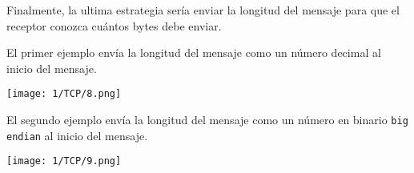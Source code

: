 Finalmente, la ultima estrategia sería enviar la longitud del mensaje
para que el receptor conozca cuántos bytes debe enviar.

El primer ejemplo envía la longitud del mensaje como un número decimal
al inicio del mensaje.

\begin{minipage}{\linewidth}
	\centering
	\texttt{[image: 1/TCP/8.png]}
	\label{fig:1/10}
\end{minipage}

El segundo ejemplo envía la longitud del mensaje como un número en binario
\verb#big endian# al inicio del mensaje.

\begin{minipage}{\linewidth}
	\centering
	\texttt{[image: 1/TCP/9.png]}
	\label{fig:1/11}
\end{minipage}
